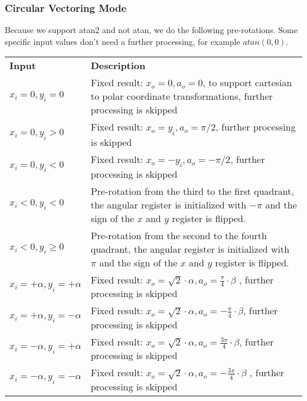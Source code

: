 \documentclass[a4paper, 12pt, notitlepage]{report}
\begin{document}
      \subsubsection{Circular Vectoring Mode}
      Because we support atan2 and not atan, we do the following pre-rotations. 
      Some specific input values don't need a further processing, for 
      example $atan( 0, 0 )$.\newline\newline
         \begin{tabular}{@{}lp{380pt}@{}}
            \rowcolor{tableheadcolor}\textbf{Input} &\textbf{ Description }  \\
      
            $x_i = 0, y_i = 0$    &    Fixed result: $x_o =  0, a_o = 0$,   
            to support cartesian to polar coordinate transformations, 
            further processing is skipped  \\ \midrule
      
            $x_i = 0, y_i > 0 $   &    Fixed result: $x_o =  y_i, a_o = \pi/2$,  
            further processing is skipped \\ \midrule
      
            $x_i = 0, y_i < 0 $   &    Fixed result: $x_o = -y_i, a_o = -\pi/2$,  
            further processing is skipped \\ \midrule
      
      
            $x_i < 0, y_i < 0 $   &    Pre-rotation from the third to the first quadrant,
                                       the angular register is initialized with $-\pi$ and
                                       the sign of the $x$ and $y$ register is flipped. \\ \midrule
      
            $x_i < 0, y_i \ge 0 $   &    Pre-rotation from the second to the fourth quadrant,
                                       the angular register is initialized with $\pi$ and
                                       the sign of the $x$ and $y$ register is flipped. \\ \midrule
      
      
            $x_i = + \alpha, y_i = + \alpha $   &  Fixed result: $x_o = \sqrt{2} \cdot \alpha, a_o = \frac{\pi}{4} \cdot \beta$ ,
            further processing is skipped \\ \midrule
      
            $x_i = + \alpha, y_i = - \alpha $   &  Fixed result: $x_o = \sqrt{2} \cdot \alpha, a_o = - \frac{\pi}{4} \cdot \beta$, 
            further processing is skipped \\ \midrule
      
            $x_i = - \alpha, y_i = + \alpha $   &  Fixed result: $x_o = \sqrt{2} \cdot \alpha, a_o =  \frac{3 \pi}{4} \cdot \beta$, 
            further processing is skipped \\ \midrule
      
            $x_i = - \alpha, y_i = - \alpha $   &  Fixed result: $x_o = \sqrt{2} \cdot \alpha, a_o = - \frac{3 \pi }{4} \cdot \beta$ ,
            further processing is skipped \\ 
            \bottomrule
         \end{tabular}
      
\end{document}
